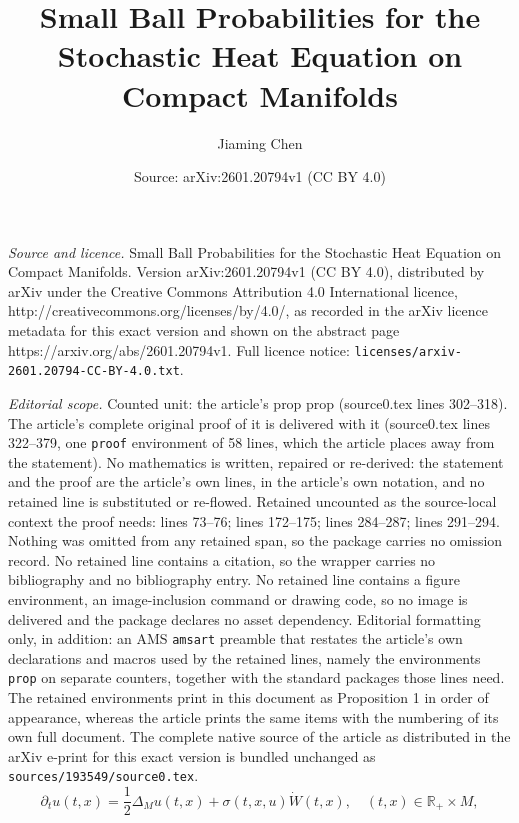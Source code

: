 \documentclass[10pt,a4paper]{amsart}
\title{Small Ball Probabilities for the Stochastic Heat Equation on Compact Manifolds}
\author{Jiaming Chen}
\date{Source: arXiv:2601.20794v1 (CC BY 4.0)}
\newcommand{\R}{\mathbb{R}}
\begin{document}
\maketitle

\noindent\emph{Source and licence.} Small Ball Probabilities for the Stochastic Heat Equation on Compact Manifolds. Version arXiv:2601.20794v1 (CC BY 4.0), distributed by arXiv under the Creative Commons Attribution 4.0 International licence, http://creativecommons.org/licenses/by/4.0/, as recorded in the arXiv licence metadata for this exact version and shown on the abstract page https://arxiv.org/abs/2601.20794v1. Full licence notice: \texttt{licenses/arxiv-2601.20794-CC-BY-4.0.txt}.\par\smallskip

\noindent\textit{Editorial scope.} Counted unit: the article's prop prop (source0.tex lines 302--318). The article's complete original proof of it is delivered with it (source0.tex lines 322--379, one \texttt{proof} environment of 58 lines, which the article places away from the statement). No mathematics is written, repaired or re-derived: the statement and the proof are the article's own lines, in the article's own notation, and no retained line is substituted or re-flowed.  Retained uncounted as the source-local context the proof needs: lines 73--76; lines 172--175; lines 284--287; lines 291--294.  Nothing was omitted from any retained span, so the package carries no omission record.  No retained line contains a citation, so the wrapper carries no bibliography and no bibliography entry.  No retained line contains a figure environment, an image-inclusion command or drawing code, so no image is delivered and the package declares no asset dependency.  Editorial formatting only, in addition: an AMS \texttt{amsart} preamble that restates the article's own declarations and macros used by the retained lines, namely the environments \texttt{prop} on separate counters, together with the standard packages those lines need.  The retained environments print in this document as Proposition 1 in order of appearance, whereas the article prints the same items with the numbering of its own full document.  The complete native source of the article as distributed in the arXiv e-print for this exact version is bundled unchanged as \texttt{sources/193549/source0.tex}.
\begin{equation}
\label{she}
\partial_t u(t,x)=\frac{1}{2}\Delta_M u(t,x)+\sigma(t,x,u)\dot{W}(t,x),\quad (t,x)\in \R_+\times M,
\end{equation}
\end{document}
